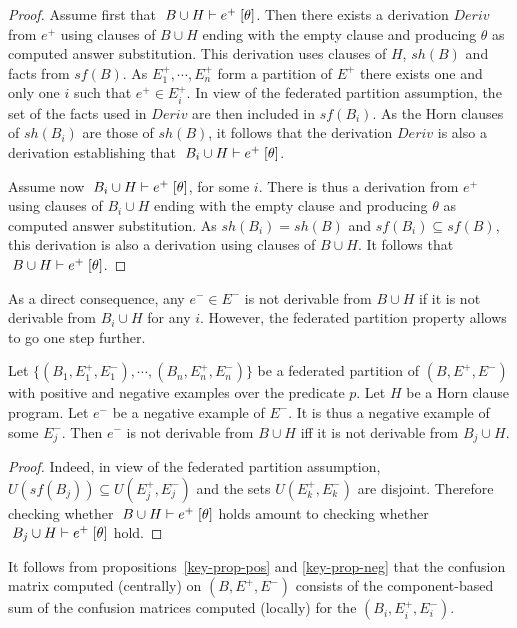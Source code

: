 \begin{proof}
Assume first that \( \mbox{$\; {B \cup H} \vdash {e^+} \; [{\theta}] $} \). Then there exists a derivation $Deriv$ from $e^+$ using clauses of $B \cup H$ ending with the empty clause and producing $\theta$ as computed answer substitution. This derivation uses clauses of $H$, $sh(B)$ and facts from $sf(B)$. As $E_1^+, \cdots, E_n^+$ form a partition of $E^+$ there exists one and only one $i$ such that $e^+ \in E_i^+$. In view of the federated partition assumption, the set of the facts used in $Deriv$ are then included in $sf(B_i)$. As the Horn clauses of $sh(B_i)$ are those of $sh(B)$, it follows that the derivation $Deriv$ is also a derivation establishing that \( \mbox{$\; {B_i \cup H} \vdash {e^+} \; [{\theta}] $} \). 

Assume now \( \mbox{$\; {B_i \cup H} \vdash {e^+} \; [{\theta}] $} \), for some $i$. There is thus a derivation from $e^+$ using clauses of $B_i \cup H$ ending with the empty clause and producing $\theta$ as computed answer substitution. As $sh(B_i) = sh(B)$ and $sf(B_i) \subseteq sf(B)$, this derivation is also a derivation using clauses of $B \cup H$. It follows that \( \mbox{$\; {B \cup H} \vdash {e^+} \; [{\theta}] $} \).
\end{proof}

As a direct consequence, any $e^- \in E^-$ is not derivable from $B \cup H$ if it is not derivable from $B_i \cup H$ for any $i$. However, the federated partition property allows to go one step further.

\begin{proposition}
\label{key-prop-neg}
Let \( \{ (B_1, E_1^+,E_1^-), \cdots, (B_n, E_n^+,E_n^-) \}
\)
be a federated partition of $(B, E^+,E^-)$ with positive and negative examples over the predicate $p$. Let $H$ be a Horn clause program. Let $e^-$ be a negative example of $E^-$. It is thus a negative example of some $E_j^-$. Then $e^-$ is not derivable from $B \cup H$ iff it is not derivable from $B_j \cup H$.
\end{proposition}

\begin{proof} 
Indeed, in view of the federated partition assumption, 
$U(sf(B_j)) \subseteq U(E_j^+,E_j^-)$ and the sets 
$U(E_k^+,E_k^-)$ are disjoint. Therefore checking whether 
\( \mbox{$\; {B \cup H} \vdash {e^+} \; [{\theta}] $} \)
holds amount to checking whether
\( \mbox{$\; {B_j \cup H} \vdash {e^+} \; [{\theta}] $} \)
hold. 
\end{proof}


It follows from propositions~\ref{key-prop-pos} and \ref{key-prop-neg} that the 
confusion matrix computed (centrally) on $(B,E^+,E^-)$ consists of the component-based sum of the confusion matrices computed (locally) for the $(B_i,E^+_i,E^-_i)$.

